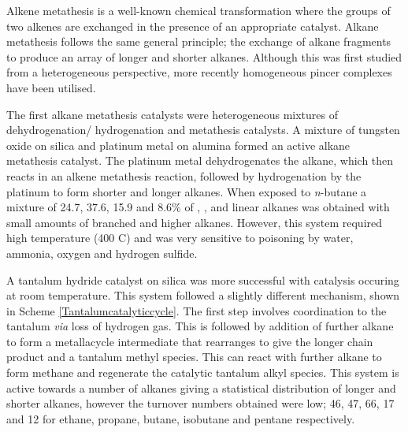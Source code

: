 Alkene metathesis is a well-known chemical transformation where the groups of two alkenes are exchanged in the presence of an appropriate catalyst.\cite{Astruc2005}  Alkane metathesis follows the same general principle; the exchange of alkane fragments to produce an array of longer and shorter alkanes.\cite{Choi2011}  Although this was first studied from a heterogeneous perspective,\cite{Burnett1973, Vidal1997, Basset2005} more recently homogeneous pincer complexes have been utilised.\cite{Goldman2006}


The first alkane metathesis catalysts were heterogeneous mixtures of dehydrogenation/ hydrogenation and metathesis catalysts.\cite{Burnett1973, Vidal1997}   A mixture of tungsten oxide on silica and platinum metal on alumina formed an active alkane metathesis catalyst.\cite{Burnett1973}  The platinum metal dehydrogenates the alkane, which then reacts in an alkene metathesis reaction, followed by hydrogenation by the platinum to form shorter and longer alkanes.  When exposed to \emph{n}-butane a mixture of 24.7, 37.6, 15.9 and 8.6\% of , ,  and  linear alkanes was obtained with small amounts of branched and higher alkanes.  However, this system required high temperature (400 \degrees C) and was very sensitive to poisoning by water, ammonia, oxygen and hydrogen sulfide.\cite{Burnett1973}

A tantalum hydride catalyst on silica was more successful with catalysis occuring at room temperature.\cite{Vidal1997}  This system followed a slightly different mechanism, shown in Scheme \ref{Tantalumcatalyticcycle}.  The first step involves coordination to the tantalum \emph{via} loss of hydrogen gas.  This is followed by addition of further alkane to form a metallacycle intermediate that rearranges to give the longer chain product and a tantalum methyl species.  This can react with further alkane to form methane and regenerate the catalytic tantalum alkyl species.  This system is active towards a number of alkanes giving a statistical distribution of longer and shorter alkanes, however the turnover numbers obtained were low; 46, 47, 66, 17 and 12 for ethane, propane, butane, isobutane and pentane respectively.\cite{Vidal1997}

